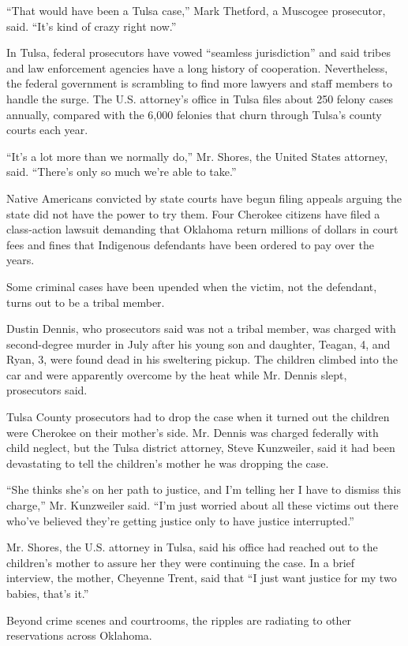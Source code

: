 ``That would have been a Tulsa case,'' Mark Thetford, a Muscogee
prosecutor, said. ``It's kind of crazy right now.''

In Tulsa, federal prosecutors have vowed ``seamless jurisdiction'' and
said tribes and law enforcement agencies have a long history of
cooperation. Nevertheless, the federal government is scrambling to find
more lawyers and staff members to handle the surge. The U.S. attorney's
office in Tulsa files about 250 felony cases annually, compared with the
6,000 felonies that churn through Tulsa's county courts each year.

``It's a lot more than we normally do,'' Mr. Shores, the United States
attorney, said. ``There's only so much we're able to take.''

Native Americans convicted by state courts have begun filing appeals
arguing the state did not have the power to try them. Four Cherokee
citizens have filed a class-action lawsuit demanding that Oklahoma
return millions of dollars in court fees and fines that Indigenous
defendants have been ordered to pay over the years.

Some criminal cases have been upended when the victim, not the
defendant, turns out to be a tribal member.

Dustin Dennis, who prosecutors said was not a tribal member, was charged
with second-degree murder in July after his young son and daughter,
Teagan, 4, and Ryan, 3, were found dead in his sweltering pickup. The
children climbed into the car and were apparently overcome by the heat
while Mr. Dennis slept, prosecutors said.

Tulsa County prosecutors had to drop the case when it turned out the
children were Cherokee on their mother's side. Mr. Dennis was charged
federally with child neglect, but the Tulsa district attorney, Steve
Kunzweiler, said it had been devastating to tell the children's mother
he was dropping the case.

``She thinks she's on her path to justice, and I'm telling her I have to
dismiss this charge,'' Mr. Kunzweiler said. ``I'm just worried about all
these victims out there who've believed they're getting justice only to
have justice interrupted.''

Mr. Shores, the U.S. attorney in Tulsa, said his office had reached out
to the children's mother to assure her they were continuing the case. In
a brief interview, the mother, Cheyenne Trent, said that ``I just want
justice for my two babies, that's it.''

Beyond crime scenes and courtrooms, the ripples are radiating to other
reservations across Oklahoma.

